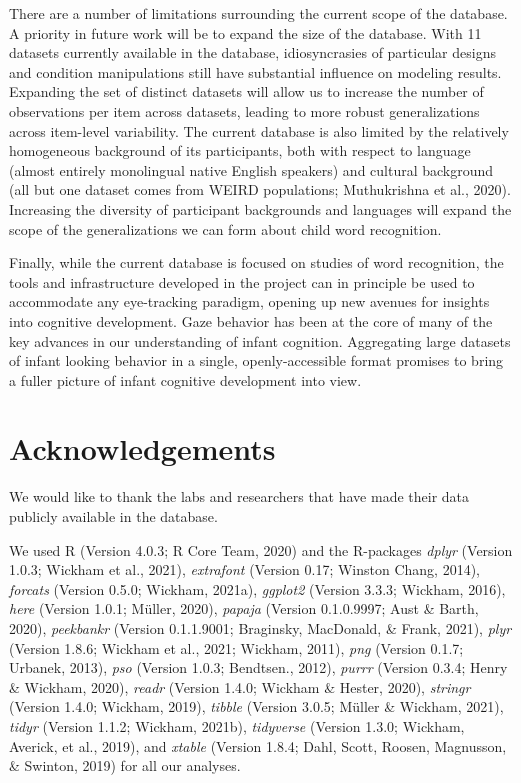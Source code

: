 \documentclass[
  english,
  man,floatsintext]{apa6}
\begin{document}
There are a number of limitations surrounding the current scope of the database.
A priority in future work will be to expand the size of the database.
With 11 datasets currently available in the database, idiosyncrasies of particular designs and condition manipulations still have substantial influence on modeling results.
Expanding the set of distinct datasets will allow us to increase the number of observations per item across datasets, leading to more robust generalizations across item-level variability.
The current database is also limited by the relatively homogeneous background of its participants, both with respect to language (almost entirely monolingual native English speakers) and cultural background (all but one dataset comes from WEIRD populations; Muthukrishna et al., 2020).
Increasing the diversity of participant backgrounds and languages will expand the scope of the generalizations we can form about child word recognition.

Finally, while the current database is focused on studies of word recognition, the tools and infrastructure developed in the project can in principle be used to accommodate any eye-tracking paradigm, opening up new avenues for insights into cognitive development.
Gaze behavior has been at the core of many of the key advances in our understanding of infant cognition.
Aggregating large datasets of infant looking behavior in a single, openly-accessible format promises to bring a fuller picture of infant cognitive development into view.

\hypertarget{acknowledgements}{%
\section{Acknowledgements}\label{acknowledgements}}

We would like to thank the labs and researchers that have made their data publicly available in the database.

We used R (Version 4.0.3; R Core Team, 2020) and the R-packages \emph{dplyr} (Version 1.0.3; Wickham et al., 2021), \emph{extrafont} (Version 0.17; Winston Chang, 2014), \emph{forcats} (Version 0.5.0; Wickham, 2021a), \emph{ggplot2} (Version 3.3.3; Wickham, 2016), \emph{here} (Version 1.0.1; Müller, 2020), \emph{papaja} (Version 0.1.0.9997; Aust \& Barth, 2020), \emph{peekbankr} (Version 0.1.1.9001; Braginsky, MacDonald, \& Frank, 2021), \emph{plyr} (Version 1.8.6; Wickham et al., 2021; Wickham, 2011), \emph{png} (Version 0.1.7; Urbanek, 2013), \emph{pso} (Version 1.0.3; Bendtsen., 2012), \emph{purrr} (Version 0.3.4; Henry \& Wickham, 2020), \emph{readr} (Version 1.4.0; Wickham \& Hester, 2020), \emph{stringr} (Version 1.4.0; Wickham, 2019), \emph{tibble} (Version 3.0.5; Müller \& Wickham, 2021), \emph{tidyr} (Version 1.1.2; Wickham, 2021b), \emph{tidyverse} (Version 1.3.0; Wickham, Averick, et al., 2019), and \emph{xtable} (Version 1.8.4; Dahl, Scott, Roosen, Magnusson, \& Swinton, 2019) for all our analyses.
\end{document}
